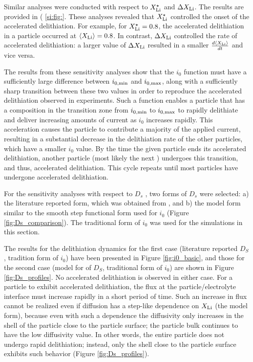 \documentclass{article}
\begin{document}
Similar analyses were conducted with respect to $X_{\rm{Li}}^{\star}$
and $\Delta X_{\rm{Li}}$. The results are provided in ( \ref{si:fig:}. These analyses revealed
that $X_{\rm{Li}}^{\star}$ controlled the onset of the accelerated
delithiation. For example, for $X_{\rm{Li}}^{\star} = 0.8$, the
accelerated delithiation in a particle occurred at
$\left<X_{\rm{Li}}\right> = 0.8$. In contrast, $\Delta X_{\rm{Li}}$
controlled the rate of accelerated delithiation: a larger value of
$\Delta X_{\rm{Li}}$ resulted in a smaller
$\frac{d\left<X_{\rm{Li}}\right>}{dt}$ and vice versa.

The results from these sensitivity analyses show that the $i_0$
function must have a sufficiently large difference between
$i_{0,\rm{min}}$ and $i_{0,\rm{max}}$, along with a sufficiently sharp
transition between these two values in order to reproduce the
accelerated delithiation observed in experiments. Such a function
enables a particle that has a composition in the transition zone from
$i_{0,\rm{min}}$ to $i_{0,\rm{max}}$ to rapidly delithiate and deliver
increasing amounts of current as $i_0$ increases rapidly. This
acceleration causes the particle to contribute a majority of the
applied current, resulting in a substantial decrease in the
delithiation rate of the other particles, which have a smaller $i_0$
value. By the time the given particle ends its accelerated
delithiation, another particle (most likely the next ) undergoes this transition, and thus, accelerated
delithiation. This cycle repeats until most particles have undergone
accelerated delithiation.


For the sensitivity analyses with respect to $D_s$ , two forms of
$D_s$ were selected: a) the literature reported form, which was
obtained from , and b) the model form similar to
the smooth step functional form used for $i_0$ (Figure
\ref{fig:Ds_comparison}). The traditional form of $i_0$ was used for
the simulations in this section.

The results for the delithiation dynamics for the first case
(literature reported $D_S$, tradition form of $i_0$) have been
presented in Figure \ref{fig:i0_basic}, and those for the second case
(model for of $D_S$, traditional form of $i_0$) are shown in Figure
\ref{fig:Ds_profiles}. No accelerated delithiation is observed in
either case. For a particle to exhibit accelerated delithiation, the
 flux at the particle/electrolyte interface must increase
rapidly in a short period of time. Such an increase in flux cannot be
realized even if diffusion has a step-like dependence on $X_{\rm{Li}}$
(the model form), because even with such a dependence the diffusivity
only increases in the shell of the particle close to the particle
surface; the particle bulk continues to have the low diffusivity
value. In other words, the entire particle does not undergo rapid
delithiation; instead, only the shell close to the particle surface
exhibits such behavior (Figure \ref{fig:Ds_profiles}).
\end{document}
